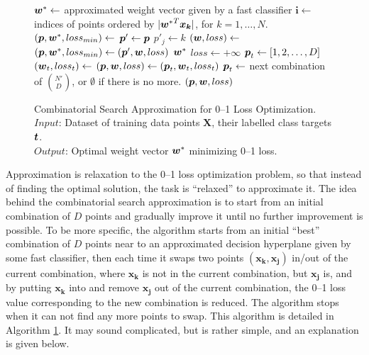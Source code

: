 \begin{figure}
\caption{
Combinatorial Search Approximation for 0--1 Loss Optimization. \\
\text{\hspace{2.1cm}} $Input$: Dataset of training data points $ \boldsymbol{X}$, their labelled class targets $\boldsymbol{t}$. \\
\text{\hspace{2.1cm}} $Output$: Optimal weight vector $\boldsymbol{w}^*$ minimizing 0--1 loss.
}
\label{alg:cs.approximation}
\begin{algorithmic}[1]
 
\State $\boldsymbol{w}^* \gets$ approximated weight vector given by a fast classifier
\State $\boldsymbol{i} \gets$ indices of points ordered by $|{\boldsymbol{w}^*}^T\boldsymbol{x_k}|$, for $k=1, \dots, N$.
\State $(\boldsymbol{p}, \boldsymbol{w}^*, loss_{min}) \gets$ 
\Loop
            \State $\boldsymbol{p}' \gets \boldsymbol{p}$
            \State $p'_j \gets k$
            \State $(\boldsymbol{w}, loss) \gets$ 
               \State $(\boldsymbol{p}, \boldsymbol{w}^*, loss_{min}) \gets (\boldsymbol{p}', \boldsymbol{w}, loss)$
            \EndIf
         \EndFor
      \EndIf
   \EndFor
   \State \Return $\boldsymbol{w}^*$
 \EndLoop
\Statex
{} 
   \State $loss \gets +\infty$
   \State $\boldsymbol{p}_t \gets [1,2,\dots,D]$
      \State $(\boldsymbol{w}_t, loss_t) \gets$ 
         \State $(\boldsymbol{p}, \boldsymbol{w}, loss) \gets (\boldsymbol{p}_t, \boldsymbol{w}_t, loss_t)$
      \EndIf
      \State $\boldsymbol{p}_t \gets $ next combination of ${N' \choose D}$, or $\emptyset$ if there is no more.
   \EndWhile
   \State \Return $(\boldsymbol{p}, \boldsymbol{w}, loss)$
\EndFunction
\Statex
\EndFunction
\end{algorithmic}
\end{figure}

Approximation is relaxation to the 0--1 loss optimization problem, so that instead of finding the optimal solution, the task is ``relaxed'' to approximate it. The idea behind the combinatorial search approximation is to start from an initial combination of $D$ points and gradually improve it until no further improvement is possible. To be more specific, the algorithm starts from an initial ``best'' combination of $D$ points near to an approximated decision hyperplane given by some fast classifier, then each time it swaps two points $(\boldsymbol{x_k, x_j})$ in/out of the current combination, where $\boldsymbol{x_k}$ is not in the current combination, but $\boldsymbol{x_j}$ is, and by putting $\boldsymbol{x_k}$ into and remove $\boldsymbol{x_j}$ out of the current combination, the 0--1 loss value corresponding to the new combination is reduced. The algorithm stops when it can not find any more points to swap. This algorithm is detailed in Algorithm \ref{alg:cs.approximation}. It may sound complicated, but is rather simple, and an explanation is given below.

